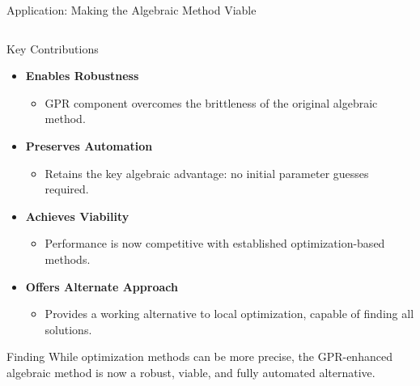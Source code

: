 \documentclass[aspectratio=169]{beamer}
\begin{document}
\begin{frame}{Application: Making the Algebraic Method Viable}
\begin{columns}[t]
    \begin{column}{0.32\textwidth}
      \vspace{-0.5em}
      \begin{block}{\small Key Contributions}
        \small
        \begin{itemize}
          \item \textbf{Enables Robustness}
          \begin{itemize}
            \tiny
            \item GPR component overcomes the brittleness of the original algebraic method.
          \end{itemize}
          
          \item \textbf{Preserves Automation}
          \begin{itemize}
            \tiny
            \item Retains the key algebraic advantage: no initial parameter guesses required.
          \end{itemize}
          
          \item \textbf{Achieves Viability}
          \begin{itemize}
            \tiny
            \item Performance is now competitive with established optimization-based methods.
          \end{itemize}
          
          \item \textbf{Offers Alternate Approach}
          \begin{itemize}
            \tiny
            \item Provides a working alternative to local optimization, capable of finding all solutions.
          \end{itemize}
        \end{itemize}
      \end{block}
      
      \vspace{1.5em}
      \begin{alertblock}{\small Finding}
        \tiny
        While optimization methods can be more precise, the GPR-enhanced algebraic method is now a robust, viable, and fully automated alternative.
      \end{alertblock}

    \end{column}
    

\end{columns}
\end{frame}
\end{document}
